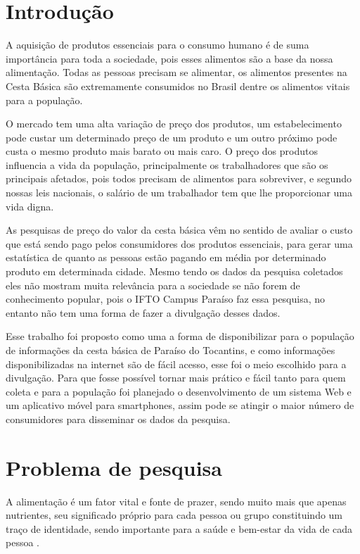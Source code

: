 \documentclass{ifto-tex}
\begin{document}
\textual

\chapter{Introdução}

A aquisição de produtos essenciais para o consumo humano é de suma importância para toda a sociedade, pois esses alimentos são a base da nossa alimentação. Todas as pessoas precisam se alimentar, os alimentos presentes na Cesta Básica são extremamente consumidos no Brasil dentre os alimentos vitais para a população.

O mercado tem uma alta variação de preço dos produtos, um estabelecimento pode custar um determinado preço de um produto e um outro próximo pode custa o mesmo produto mais barato ou mais caro. O preço dos produtos influencia a vida da população, principalmente os trabalhadores que são os principais afetados, pois todos precisam de alimentos para sobreviver, e segundo nossas leis nacionais, o salário de um trabalhador tem que lhe proporcionar uma vida digna.

As pesquisas de preço do valor da cesta básica vêm no sentido de avaliar o custo que está sendo pago pelos consumidores dos produtos essenciais, para gerar uma estatística de quanto as pessoas estão pagando em média por determinado produto em determinada cidade. Mesmo tendo os dados da pesquisa coletados eles não mostram muita relevância para a sociedade se não forem de conhecimento popular, pois o IFTO Campus Paraíso faz essa pesquisa, no entanto não tem uma forma de fazer a divulgação desses dados.

Esse trabalho foi proposto como uma a forma de disponibilizar para o população de informações da cesta básica de Paraíso do Tocantins, e como informações disponibilizadas na internet são de fácil acesso, esse foi o meio escolhido para a divulgação. Para que fosse possível tornar mais prático e fácil tanto para quem coleta e para a população foi planejado o desenvolvimento de um sistema Web e um aplicativo móvel para smartphones, assim pode se atingir o maior número de consumidores para disseminar os dados da pesquisa.

	
	

\chapter{Problema de pesquisa}
	
		A alimentação é um fator vital e fonte de prazer, sendo muito mais que apenas nutrientes, seu significado próprio para cada pessoa ou grupo constituindo um traço de identidade, sendo importante para a saúde e bem-estar da vida de cada pessoa \cite{loureiro2004importancia}.
		
\end{document}
